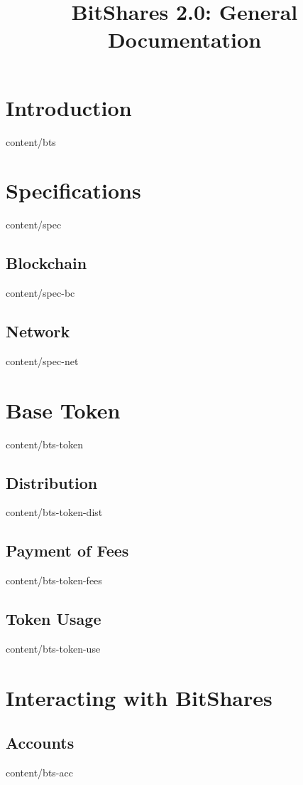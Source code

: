 \documentclass[conference,final,10pt,a4paper]{IEEEtran}
\title{BitShares 2.0: General Documentation}
\author{}
\begin{document}
\sloppy
\maketitle

\begin{abstract}
\end{abstract}
\section    { Introduction    }  { content/bts            } 

\section    { Specifications  }  { content/spec           } 
\subsection { Blockchain      }  { content/spec-bc        } 
\subsection { Network         }  { content/spec-net       } 

\section    { Base Token      }  { content/bts-token      } 
\subsection { Distribution    }  { content/bts-token-dist } 
\subsection { Payment of Fees }  { content/bts-token-fees } 
\subsection { Token Usage     }  { content/bts-token-use  } 

\section    { Interacting with BitShares }
\subsection { Accounts        }  { content/bts-acc        } 
\end{document}
